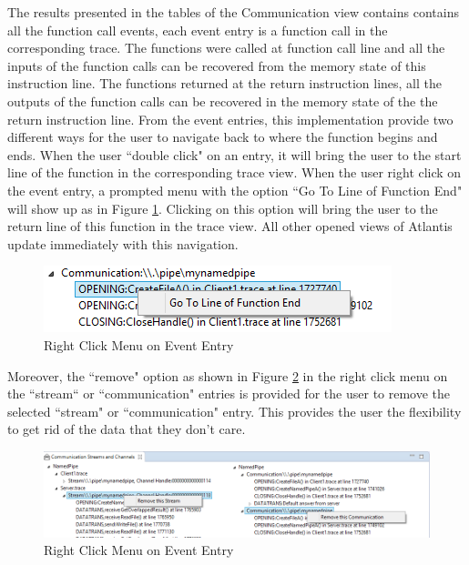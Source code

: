 The results presented in the tables of the Communication view contains contains all the function call events, each event entry is a function call in the corresponding trace. The functions were called at function call line and all the inputs of the function calls can be recovered from the memory state of this instruction line. The functions returned at the return instruction lines, all the outputs of the function calls can be recovered in the memory state of the the return instruction line. From the event entries, this implementation provide two different ways for the user to navigate back to where the function begins and ends. When the user ``double click" on an entry, it will bring the user to the start line of the function in the corresponding trace view. When the user right click on the event entry, a prompted menu with the option ``Go To Line of Function End" will show up as in Figure \ref{gotoend}. Clicking on this option will bring the user to the return line of this function in the trace view. All other opened views of Atlantis update immediately with this navigation. 

\begin{figure}[H]
\centerline{\includegraphics{Figures/gotoend}}
 \caption{Right Click Menu on Event Entry}
\label{gotoend}
\end{figure}

Moreover, the ``remove" option as shown in Figure \ref{remove} in the right click menu on the ``stream“ or ``communication" entries is provided for the user to remove the selected ``stream" or ``communication" entry. This provides the user the flexibility to get rid of the data that they don't care.

\begin{figure}[H]
\centerline{\includegraphics[scale=0.7]{Figures/remove}}
 \caption{Right Click Menu on Event Entry}
\label{remove}
\end{figure}

